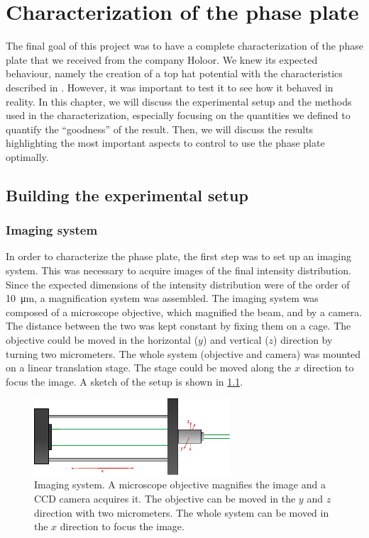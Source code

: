 \chapter{Characterization of the phase plate}
The final goal of this project was to have a complete characterization of the phase plate that we received from the company Holoor. We knew its expected behaviour, namely the creation of a top hat potential with the characteristics described in . However, it was important to test it to see how it behaved in reality. In this chapter, we will discuss the experimental setup and the methods used in the characterization, especially focusing on the quantities we defined to quantify the \enquote{goodness} of the result. Then, we will discuss the results highlighting the most important aspects to control to use the phase plate optimally.

\section{Building the experimental setup}
\subsection{Imaging system}
In order to characterize the phase plate, the first step was to set up an imaging system. This was necessary to acquire images of the final intensity distribution. Since the expected dimensions of the intensity distribution were of the order of \SI{10}{\micro\meter}, a magnification system was assembled. The imaging system was composed of a microscope objective, which magnified the beam, and by a camera. The distance between the two was kept constant by fixing them on a cage. The objective could be moved in the horizontal ($y$) and vertical ($z$) direction by turning two micrometers. The whole system (objective and camera) was mounted on a linear translation stage. The stage could be moved along the $x$ direction to focus the image. A sketch of the setup is shown in \cref{fig:imaging}.

\begin{figure}
    \centering
    \includegraphics[width=0.65\textwidth]{chapters/chapter_3/figures/imaging}
    \caption{Imaging system. A microscope objective magnifies the image and a CCD camera acquires it. The objective can be moved in the $y$ and $z$ direction with two micrometers. The whole system can be moved in the $x$ direction to focus the image.}
    \label{fig:imaging}
\end{figure}


